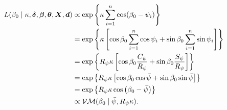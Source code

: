 \begin{align*}
L(\beta_0 \mid \kappa, \boldsymbol{\delta}, \boldsymbol{\beta}, \boldsymbol{\theta}, \boldsymbol{X}, \boldsymbol{d}) & \propto \exp \left\lbrace \kappa \sum_{i=1}^n \cos ( \beta_0 - \psi_i)  \right\rbrace \\
& = \exp \left\lbrace \kappa   \left[ \cos\beta_0 \sum_{i=1}^n \cos\psi_i +  \sin\beta_0 \sum_{i=1}^n \sin\psi_i \right]  \right\rbrace \\
& = \exp \left\lbrace R_{\psi}  \kappa  \left[ \cos\beta_0 \frac{C_{\psi}}{R_{\psi}} +  \sin\beta_0 \frac{S_{\psi}}{R_{\psi}} \right]  \right\rbrace \\
& = \exp \left\lbrace R_{\psi} \kappa   \left[ \cos\beta_0 \cos{\bar\psi} +  \sin\beta_0 \sin{\bar\psi}\right]  \right\rbrace \\
& = \exp \left\lbrace R_{\psi} \kappa \cos \left( \beta_0 - \bar\psi \right)  \right\rbrace \\
& \propto \mathcal{VM}(\beta_0 \mid \bar\psi, R_{\psi} \kappa).
\end{align*}









